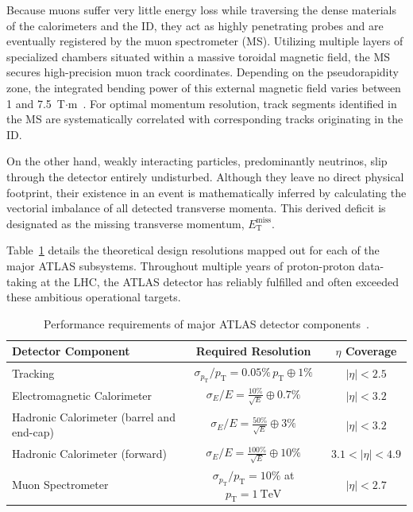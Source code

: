 Because muons suffer very little energy loss while traversing the dense materials of the calorimeters and the ID, they act as highly penetrating probes and are eventually registered by the muon spectrometer (MS). Utilizing multiple layers of specialized chambers situated within a massive toroidal magnetic field, the MS secures high-precision muon track coordinates. Depending on the pseudorapidity zone, the integrated bending power of this external magnetic field varies between 1 and 7.5~T$\cdot$m~\cite{PERF-2007-01}. For optimal momentum resolution, track segments identified in the MS are systematically correlated with corresponding tracks originating in the ID.

On the other hand, weakly interacting particles, predominantly neutrinos, slip through the detector entirely undisturbed. Although they leave no direct physical footprint, their existence in an event is mathematically inferred by calculating the vectorial imbalance of all detected transverse momenta. This derived deficit is designated as the missing transverse momentum, $E_{\text{T}}^{\text{miss}}$.

 Table~\ref{tab:detector-performance} details the theoretical design resolutions mapped out for each of the major ATLAS subsystems. Throughout multiple years of proton-proton data-taking at the LHC, the ATLAS detector has reliably fulfilled and often exceeded these ambitious operational targets.

\begin{table}[!htbp]
\centering
\begin{tabular}{lcc}
\hline
\textbf{Detector Component} & \textbf{Required Resolution} & \textbf{$\eta$ Coverage} \\
\hline

Tracking 
& $\sigma_{p_{\text{T}}}/p_{\text{T}} = 0.05\%\,p_{\text{T}} \oplus 1\%$ 
& $|\eta| < 2.5$ \\

Electromagnetic Calorimeter 
& $\sigma_E/E = \frac{10\%}{\sqrt{E}} \oplus 0.7\%$ 
& $|\eta| < 3.2$ \\

Hadronic Calorimeter (barrel and end-cap) 
& $\sigma_E/E = \frac{50\%}{\sqrt{E}} \oplus 3\%$ 
& $|\eta| < 3.2$ \\

Hadronic Calorimeter (forward) 
& $\sigma_E/E = \frac{100\%}{\sqrt{E}} \oplus 10\%$ 
& $3.1 < |\eta| < 4.9$ \\

Muon Spectrometer 
& $\sigma_{p_{\text{T}}}/p_{\text{T}} = 10\%$ at $p_{\text{T}} = 1~\text{TeV}$ 
& $|\eta| < 2.7$ \\

\hline
\end{tabular}
\caption{Performance requirements of major ATLAS detector components~\cite{PERF-2007-01,ATLAS2008}.}
\label{tab:detector-performance}
\end{table}


